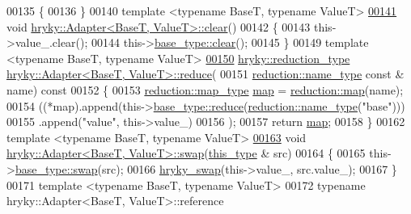 \begin{DoxyCode}
00135 \{
00136 \}
00140 \textcolor{keyword}{template} <\textcolor{keyword}{typename} BaseT, \textcolor{keyword}{typename} ValueT>
\hypertarget{adapter_8h_source_l00141}{}\hyperlink{classhryky_1_1_adapter_adbdbd187b837f6782b776ca8aabd411b}{00141} \textcolor{keywordtype}{void} \hyperlink{namespacehryky_aa201297ea9530da954a7230be71cc19d}{hryky::Adapter<BaseT, ValueT>::clear}()
00142 \{
00143     this->value\_.clear();
00144     this->\hyperlink{namespacehryky_aa201297ea9530da954a7230be71cc19d}{base_type::clear}();
00145 \}
00149 \textcolor{keyword}{template} <\textcolor{keyword}{typename} BaseT, \textcolor{keyword}{typename} ValueT>
\hypertarget{adapter_8h_source_l00150}{}\hyperlink{classhryky_1_1_adapter_a42532b43ac680d162bbc1a2e3ebc6b99}{00150} \hyperlink{classhryky_1_1_intrusive_ptr}{hryky::reduction_type} \hyperlink{namespacehryky_af41cb3af6766761da0ff21b84527a52c}{hryky::Adapter<BaseT, ValueT>::reduce}(
00151     \hyperlink{classhryky_1_1reduction_1_1_string}{reduction::name_type} \textcolor{keyword}{const} & name)\textcolor{keyword}{ const}
00152 \textcolor{keyword}{}\{
00153     \hyperlink{classhryky_1_1_intrusive_ptr}{reduction::map_type} \hyperlink{namespacehryky_1_1reduction_ac5eae270cf8047b294dc4ff3e5e11a79}{map} = \hyperlink{namespacehryky_1_1reduction_ac5eae270cf8047b294dc4ff3e5e11a79}{reduction::map}(name);
00154     ((*map).append(this->\hyperlink{namespacehryky_af41cb3af6766761da0ff21b84527a52c}{base_type::reduce}(\hyperlink{classhryky_1_1reduction_1_1_string}{reduction::name_type}(\textcolor{stringliteral}{"base"})))
00155      .append(\textcolor{stringliteral}{"value"}, this->value\_)
00156      );
00157     \textcolor{keywordflow}{return} \hyperlink{namespacehryky_1_1reduction_ac5eae270cf8047b294dc4ff3e5e11a79}{map};
00158 \}
00162 \textcolor{keyword}{template} <\textcolor{keyword}{typename} BaseT, \textcolor{keyword}{typename} ValueT>
\hypertarget{adapter_8h_source_l00163}{}\hyperlink{classhryky_1_1_adapter_ae95517793bc16f6ba623bc994bc17c43}{00163} \textcolor{keywordtype}{void} \hyperlink{namespacehryky_a4282146df5ea2b68cb667896a2205909}{hryky::Adapter<BaseT, ValueT>::swap}(\hyperlink{classhryky_1_1_adapter}{this_type} & src)
00164 \{
00165     this->\hyperlink{namespacehryky_a4282146df5ea2b68cb667896a2205909}{base_type::swap}(src);
00166     \hyperlink{namespacehryky_add9c1c1fdfda07cd47bcb7c16d3a823a}{hryky_swap}(this->value\_, src.value\_);
00167 \}
00171 \textcolor{keyword}{template} <\textcolor{keyword}{typename} BaseT, \textcolor{keyword}{typename} ValueT>
00172 \textcolor{keyword}{typename} hryky::Adapter<BaseT, ValueT>::reference 

\end{DoxyCode}
